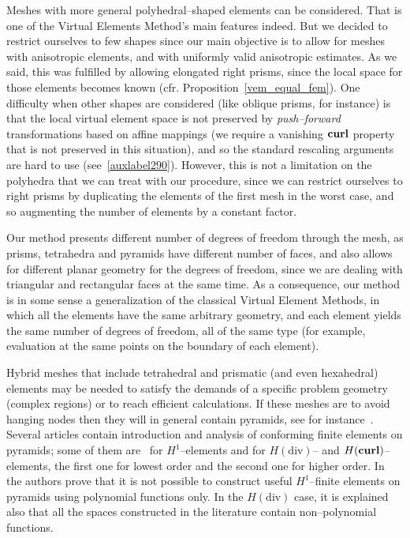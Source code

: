 Meshes with more general polyhedral--shaped elements can be considered. 
That is one of the Virtual Elements Method's main features indeed. 
But we decided to restrict
ourselves to few 
shapes since our main objective is to allow for meshes with anisotropic elements, 
and with uniformly valid anisotropic 
estimates. As we said, this was fulfilled by allowing elongated right prisms, 
since the local space for
those elements becomes known (cfr. Proposition~\ref{vem_equal_fem}). One 
difficulty when other shapes are considered (like
oblique prisms, for instance) is that the local virtual element space is not 
preserved by 
\emph{push--forward} transformations based on affine mappings
(we require a vanishing ${\bf curl}$ property that is not preserved in this 
situation), and so the standard rescaling arguments are hard to use 
(see~\ref{auxlabel290}). However, this is not a limitation on the polyhedra
that we can treat with our procedure, since we can restrict ourselves
to right prisms by duplicating the elements of the first mesh in the worst case,
and so augmenting the number of elements by a constant factor.

Our method presents different number of degrees of freedom through the 
mesh, as prisms, tetrahedra and pyramids have different number of faces, and also 
allows for different planar geometry for the degrees of freedom, since we are 
dealing
with triangular and rectangular faces at the same time. As a consequence, our 
method is in some sense a generalization of the classical Virtual Element Methods,
in which all the elements have the same arbitrary geometry, and each element yields
the same number of degrees of freedom, all of the same type (for example, 
evaluation at the same points on the boundary of each element).

Hybrid meshes that include tetrahedral and prismatic (and even hexahedral) 
elements may be needed to satisfy the demands of a specific problem geometry 
(complex regions) or to reach efficient calculations. If these meshes are 
to avoid hanging nodes then they will in general contain pyramids, see 
for instance~\cite{owenSaigal}. Several articles contain introduction and analysis
of conforming finite elements on pyramids; some of them are~\cite{bergot} 
for $H^1$--elements and 
\cite{gh99, Nigam-2012} for $H(\mbox{div})$-- and $H({\bf curl})$--elements, 
the first one for 
lowest order and the second one for higher order. 
In~\cite{Nigam-2012} the authors prove that it is not possible to construct 
useful $H^1$--finite 
elements on pyramids using  polynomial functions only. In the $H(\mbox{div})$ 
case, it is explained also that all the spaces 
constructed in the literature contain non--polynomial functions.

